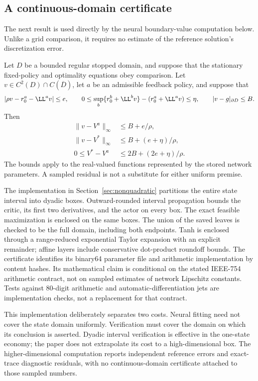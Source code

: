 \subsection{A continuous-domain certificate}
The next result is used directly by the neural boundary-value computation below. Unlike a grid comparison, it requires no estimate of the reference solution's discretization error.

\begin{proposition}\label{prop:stationary-r5}
Let $D$ be a bounded regular stopped domain, and suppose that the stationary fixed-policy and optimality equations obey comparison. Let $v\in C^2(D)\cap C(\overline D)$, let $a$ be an admissible feedback policy, and suppose that
\[
 |\rho v-r_0^a-\LL^av|\leq e,\qquad
 0\leq\sup_b\{r_0^b+\LL^bv\}-(r_0^a+\LL^av)\leq\eta,
 \qquad |v-g|_{\partial D}\leq B.
\]
Then
\begin{align}
 \|v-V^a\|_\infty&\leq B+e/\rho,\label{eq:stationarypolicy-r5}\\
 \|v-V^*\|_\infty&\leq B+(e+\eta)/\rho,\label{eq:stationaryvalue-r5}\\
 0\leq V^*-V^a&\leq2B+(2e+\eta)/\rho.\label{eq:stationaryregret-r5}
\end{align}
The bounds apply to the real-valued functions represented by the stored network parameters. A sampled residual is not a substitute for either uniform premise.
\end{proposition}

The implementation in Section~\ref{sec:nonquadratic} partitions the entire state interval into dyadic boxes. Outward-rounded interval propagation bounds the critic, its first two derivatives, and the actor on every box. The exact feasible maximization is enclosed on the same boxes. The union of the saved leaves is checked to be the full domain, including both endpoints. Tanh is enclosed through a range-reduced exponential Taylor expansion with an explicit remainder; affine layers include conservative dot-product roundoff bounds. The certificate identifies its binary64 parameter file and arithmetic implementation by content hashes. Its mathematical claim is conditional on the stated IEEE-754 arithmetic contract, not on sampled estimates of network Lipschitz constants. Tests against 80-digit arithmetic and automatic-differentiation jets are implementation checks, not a replacement for that contract.

This implementation deliberately separates two costs. Neural fitting need not cover the state domain uniformly. Verification must cover the domain on which its conclusion is asserted. Dyadic interval verification is effective in the one-state economy; the paper does not extrapolate its cost to a high-dimensional box. The higher-dimensional computation reports independent reference errors and exact-trace diagnostic residuals, with no continuous-domain certificate attached to those sampled numbers.
